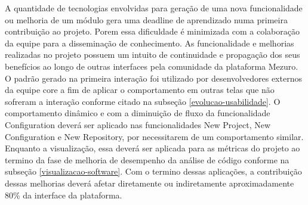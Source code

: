 A quantidade de tecnologias envolvidas para geração de uma nova funcionalidade ou melhoria de um módulo gera uma deadline de aprendizado numa primeira contribuição ao projeto. Porem essa dificuldade é minimizada com a colaboração da equipe para a disseminação de conhecimento.
As funcionalidade e melhorias realizadas no projeto possuem um intuito de continuidade e propagação dos seus benefícios ao longo de outras interfaces pela comunidade da plataforma Mezuro. O padrão gerado na primeira interação foi utilizado por desenvolvedores externos da equipe core a fim de aplicar o comportamento em outras telas que não sofreram a interação conforme citado na subseção \ref{evolucao-usabilidade}. O comportamento dinâmico e com a diminuição de fluxo da funcionalidade Configuration deverá ser aplicado nas funcionalidades New Project, New Configuration e New Repository, por necessitarem de um comportamento similar. Enquanto a visualização, essa deverá ser aplicada para as métricas do projeto ao termino da fase de melhoria de desempenho da análise de código conforme na subseção \ref{visualizacao-software}. Com o termino dessas aplicações, a contribuição dessas melhorias deverá afetar diretamente ou indiretamente aproximadamente 80\% da interface da plataforma.


